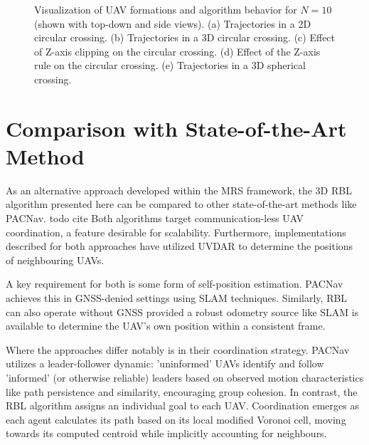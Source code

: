 \begin{figure}[H]
{                \label{fig:n_10_circle_z_rule}
            }
            \par\medskip
            \caption{
                Visualization of UAV formations and algorithm behavior for $N=10$ (shown with top-down and side views). 
                (a) Trajectories in a 2D circular crossing. 
                (b) Trajectories in a 3D circular crossing. 
                (c) Effect of Z-axis clipping on the circular crossing. 
                (d) Effect of the Z-axis rule on the circular crossing. 
                (e) Trajectories in a 3D spherical crossing.
            }
            \label{fig:trajectories}
        \end{figure}

    \section{Comparison with State-of-the-Art Method}
        As an alternative approach developed within the MRS framework, the 3D \ac{RBL} algorithm presented here can be compared to other state-of-the-art methods like PACNav. todo cite
        Both algorithms target communication-less UAV coordination, a feature desirable for scalability. 
        Furthermore, implementations described for both approaches have utilized UVDAR to determine the positions of neighbouring UAVs.

        A key requirement for both is some form of self-position estimation. 
        PACNav achieves this in GNSS-denied settings using SLAM techniques. 
        Similarly, \ac{RBL} can also operate without GNSS provided a robust odometry source like SLAM is available to determine the UAV's own position within a consistent frame.

        Where the approaches differ notably is in their coordination strategy. 
        PACNav utilizes a leader-follower dynamic: 'uninformed' UAVs identify and follow 'informed' (or otherwise reliable) leaders based on observed motion characteristics like path persistence and similarity, encouraging group cohesion. 
        In contrast, the RBL algorithm assigns an individual goal to each UAV. 
        Coordination emerges as each agent calculates its path based on its local modified Voronoi cell, moving towards its computed centroid while implicitly accounting for neighbours.

